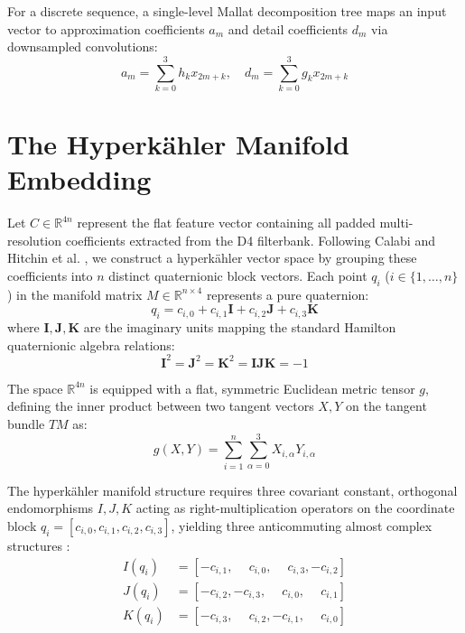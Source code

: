 \documentclass[11pt,preview,cite,epsf,twoside,amsfonts]{amsart}
\begin{document}
For a discrete sequence, a single-level Mallat decomposition tree maps an input vector to approximation coefficients $a_m$ and detail coefficients $d_m$ via downsampled convolutions:
\begin{equation}
a_m = \sum_{k=0}^{3} h_k x_{2m+k}, \quad d_m = \sum_{k=0}^{3} g_k x_{2m+k}
\end{equation}

\section{The Hyperk\"{a}hler Manifold Embedding}
Let $C \in \mathbb{R}^{4n}$ represent the flat feature vector containing all padded multi-resolution coefficients extracted from the D4 filterbank. Following Calabi \cite{calabi1979metriques} and Hitchin et al. \cite{hitchin1987hyperkahler}, we construct a hyperk\"{a}hler vector space by grouping these coefficients into $n$ distinct quaternionic block vectors. Each point $q_i$ ($i \in \{1, \dots, n\}$) in the manifold matrix $M \in \mathbb{R}^{n \times 4}$ represents a pure quaternion:
\begin{equation}
q_i = c_{i,0} + c_{i,1}\mathbf{I} + c_{i,2}\mathbf{J} + c_{i,3}\mathbf{K}
\end{equation}
where $\mathbf{I}, \mathbf{J}, \mathbf{K}$ are the imaginary units mapping the standard Hamilton quaternionic algebra relations:
\begin{equation}
\mathbf{I}^2 = \mathbf{J}^2 = \mathbf{K}^2 = \mathbf{IJK} = -1
\end{equation}

The space $\mathbb{R}^{4n}$ is equipped with a flat, symmetric Euclidean metric tensor $g$, defining the inner product between two tangent vectors $X, Y$ on the tangent bundle $TM$ as:
\begin{equation}
g(X, Y) = \sum_{i=1}^{n} \sum_{\alpha=0}^{3} X_{i,\alpha} Y_{i,\alpha}
\end{equation}

The hyperk\"{a}hler manifold structure requires three covariant constant, orthogonal endomorphisms $I, J, K$ acting as right-multiplication operators on the coordinate block $q_i = [c_{i,0}, c_{i,1}, c_{i,2}, c_{i,3}]$, yielding three anticommuting almost complex structures \cite{hitchin1992hyperkahler}:
\begin{align}
I(q_i) &= [-c_{i,1}, \phantom{-}c_{i,0}, \phantom{-}c_{i,3}, -c_{i,2}] \\
J(q_i) &= [-c_{i,2}, -c_{i,3}, \phantom{-}c_{i,0}, \phantom{-}c_{i,1}] \\
K(q_i) &= [-c_{i,3}, \phantom{-}c_{i,2}, -c_{i,1}, \phantom{-}c_{i,0}]
\end{align}
\end{document}
